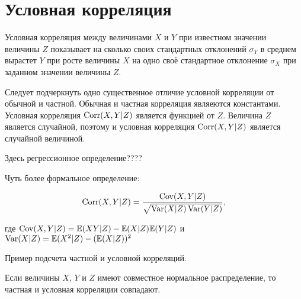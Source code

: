 \documentclass[10pt]{article}
\begin{document}
\section{Условная корреляция}

\begin{definition}
Условная корреляция между величинами $X$ и $Y$ при известном значении величины $Z$ показывает на сколько своих стандартных отклонений $\sigma_Y$ в среднем вырастет $Y$ при росте величины $X$ на одно своё стандартное отклонение $\sigma_X$ при заданном значении величины $Z$.
\end{definition}


Следует подчеркнуть одно существенное отличие условной корреляции от обычной и частной. Обычная и частная корреляция являеются константами. Условная корреляция $\operatorname{Corr}(X,Y|Z)$ является функцией от $Z$. Величина $Z$ является случайной, поэтому и условная корреляция $\operatorname{Corr}(X,Y|Z)$ является случайной величиной. 

Здесь регрессионное определение???? 

Чуть более формальное определение:

\begin{definition}
\[
\operatorname{Corr}(X,Y|Z) = \frac{\operatorname{Cov}(X,Y|Z)}{\sqrt{\operatorname{Var}(X|Z)\operatorname{Var}(Y|Z)}},
\]
\end{definition}

где $\operatorname{Cov}(X,Y|Z)=\mathbb{E}(XY|Z)-\mathbb{E}(X|Z)\mathbb{E}(Y|Z)$ и $\operatorname{Var}(X|Z)=\mathbb{E}(X^2|Z)-(\mathbb{E}(X|Z))^2$


Пример подсчета частной и условной корреляций.

\begin{theorem}
Если величины $X$, $Y$ и $Z$ имеют совместное нормальное распределение, то частная и условная корреляции совпадают.
\end{theorem}
\end{document}
